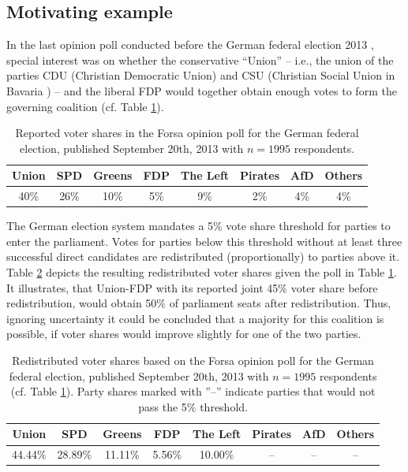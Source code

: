 \documentclass[smallcondensed]{svjour3}     %
\begin{document}
\subsection{Motivating example}\label{ssec:intro-ex-fdp}
In the last opinion poll conducted before the German federal election 2013 \citep{forsa_2013},
special interest was on whether the conservative ``Union'' -- i.e., the union of
the parties CDU (Christian Democratic Union) and CSU (Christian Social Union in Bavaria ) -- and the liberal FDP would together obtain enough votes to form the governing coalition (cf. Table \ref{tab_fdp}).

\begin{table}[!ht]\centering
\caption{Reported voter shares in the Forsa opinion poll for the German federal
election, published September 20th, 2013 with $n=1995$ respondents.
\label{tab_fdp}
}
\medskip
\begin{tabular}{cccccccc}
\toprule[0.09 em]
Union & SPD & Greens & FDP & The Left & Pirates & AfD & Others \\
\midrule
40\% & 26\% & 10\% & 5\% & 9\% & 2\% & 4\% & 4\% \\
\bottomrule[0.09 em]
\end{tabular}
\end{table}

The German election system mandates a 5\% vote share threshold for parties to enter the parliament.
Votes for parties below this threshold without at least three successful direct candidates are redistributed (proportionally) to parties above it. Table \ref{tab_fdp_redist} depicts the resulting redistributed voter shares given the poll in Table \ref{tab_fdp}. It illustrates, that Union-FDP with
its reported joint 45\% voter share before redistribution, would obtain 50\% of parliament seats after redistribution. Thus, ignoring uncertainty it could be concluded that a majority for this coalition is possible, if voter shares would improve slightly for one of the two parties.

\begin{table}[!ht]\centering
\caption{Redistributed voter shares based on the Forsa opinion poll for the German federal election,
published September 20th, 2013 with $n=1995$ respondents (cf. Table \ref{tab_fdp}).
Party shares marked with ''--'' indicate parties that would not pass the 5\% threshold.
\label{tab_fdp_redist}
}
\medskip
\begin{tabular}{cccccccc}
\toprule[0.09 em]
Union & SPD & Greens & FDP & The Left & Pirates & AfD & Others \\
\midrule
44.44\% & 28.89\% & 11.11\% & 5.56\% & 10.00\% & -- & -- & -- \\
\bottomrule[0.09 em]
\end{tabular}
\end{table}
\end{document}
